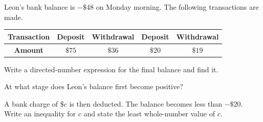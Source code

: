  Leon's bank balance is $-\$48$ on Monday morning. The following transactions are made.
\begin{center}
\begin{tabular}{|c|c|c|c|c|}
\hline
\textbf{Transaction} & Deposit & Withdrawal & Deposit & Withdrawal\\ \hline
\textbf{Amount} & $\$75$ & $\$36$ & $\$20$ & $\$19$\\ \hline
\end{tabular}
\end{center}
\begin{subparts}
  \item Write a directed-number expression for the final balance and find it.
  \item At what stage does Leon's balance first become positive?
  \item A bank charge of $\$c$ is then deducted. The balance becomes less than $-\$20$. Write an inequality for $c$ and state the least whole-number value of $c$.
\end{subparts}
